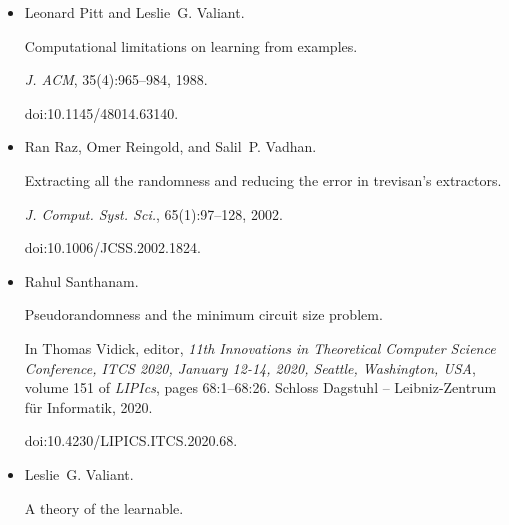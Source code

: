 \begin{itemize}
Shien Jin Ong and Salil P. Vadhan.


Zero knowledge and soundness are symmetric.


In Moni Naor, editor, \emph{Advances in Cryptology – EUROCRYPT
2007, 26th Annual International Conference on the Theory and Applications of
Cryptographic Techniques, Barcelona, Spain, May 20-24, 2007, Proceedings},
volume 4515 of \emph{Lecture Notes in Computer Science}, pages 187–209.
Springer, 2007.


doi:10.1007/978-3-540-72540-4\_11.





\item[] 
[43]

Leonard Pitt and Leslie G. Valiant.


Computational limitations on learning from examples.


\emph{J. ACM}, 35(4):965–984, 1988.


doi:10.1145/48014.63140.





\item[] 
[44]

Ran Raz, Omer Reingold, and Salil P. Vadhan.


Extracting all the randomness and reducing the error in trevisan’s
extractors.


\emph{J. Comput. Syst. Sci.}, 65(1):97–128, 2002.


doi:10.1006/JCSS.2002.1824.





\item[] 
[45]

Rahul Santhanam.


Pseudorandomness and the minimum circuit size problem.


In Thomas Vidick, editor, \emph{11th Innovations in Theoretical
Computer Science Conference, ITCS 2020, January 12-14, 2020, Seattle,
Washington, USA}, volume 151 of \emph{LIPIcs}, pages 68:1–68:26. Schloss
Dagstuhl – Leibniz-Zentrum für Informatik, 2020.


doi:10.4230/LIPICS.ITCS.2020.68.





\item[] 
[46]

Leslie G. Valiant.


A theory of the learnable.



\end{itemize}
